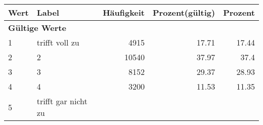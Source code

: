      \begin{longtable}{lXrrr}
     \toprule
     \textbf{Wert} & \textbf{Label} & \textbf{Häufigkeit} & \textbf{Prozent(gültig)} & \textbf{Prozent} \\
     \endhead
     \midrule
     \multicolumn{5}{l}{\textbf{Gültige Werte}}\\

     1 &
     \multicolumn{1}{X}{ trifft voll zu   } &


       \num{4915} &
       \num[round-mode=places,round-precision=2]{17.71} &
         \num[round-mode=places,round-precision=2]{17.44} \\

     2 &
     \multicolumn{1}{X}{ 2   } &


       \num{10540} &
       \num[round-mode=places,round-precision=2]{37.97} &
         \num[round-mode=places,round-precision=2]{37.4} \\

     3 &
     \multicolumn{1}{X}{ 3   } &


       \num{8152} &
       \num[round-mode=places,round-precision=2]{29.37} &
         \num[round-mode=places,round-precision=2]{28.93} \\

     4 &
     \multicolumn{1}{X}{ 4   } &


       \num{3200} &
       \num[round-mode=places,round-precision=2]{11.53} &
         \num[round-mode=places,round-precision=2]{11.35} \\

     5 &
     \multicolumn{1}{X}{ trifft gar nicht zu   } &



\end{longtable}
